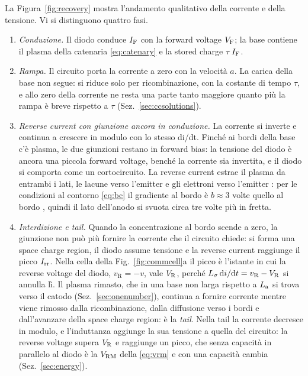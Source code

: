 \documentclass[10pt,a4paper]{scrartcl}
\let\newcommand\pdvaluedefine
\newcommand{\IF}{I_\mathrm{F}}
\newcommand{\VR}{V_\mathrm{R}}
\newcommand{\VF}{V_\mathrm{F}}
\newcommand{\Irr}{I_\mathrm{rr}}
\newcommand{\Vrm}{V_\mathrm{RM}}
\newcommand{\diff}{\mathrm{d}}
\newcommand{\Ls}{L_\sigma}                    %
\newcommand{\La}{L_\mathrm{a}}
\newcommand{\Pp}{p\textsuperscript{+}}
\newcommand{\Nm}{n\textsuperscript{--}}
\newcommand{\Np}{n\textsuperscript{+}}
\begin{document}
La Figura~\ref{fig:recovery} mostra l'andamento qualitativo della corrente e della tensione. Vi si distinguono quattro fasi.
\begin{enumerate}
\item \emph{Conduzione.} Il diodo conduce $\IF$ con la forward voltage $\VF$; la base contiene il plasma della catenaria \eqref{eq:catenary} e la stored charge $\tau\,\IF$.
\item \emph{Rampa.} Il circuito porta la corrente a zero con la velocità $a$. La carica della base non segue: si riduce solo per ricombinazione, con la costante di tempo $\tau$, e allo zero della corrente ne resta una parte tanto maggiore quanto più la rampa è breve rispetto a $\tau$ (Sez.~\ref{sec:ccsolutions}).
\item \emph{Reverse current con giunzione ancora in conduzione.} La corrente si inverte e continua a crescere in modulo con lo stesso di/dt. Finché ai bordi della base c'è plasma, le due giunzioni restano in forward bias: la tensione del diodo è ancora una piccola forward voltage, benché la corrente sia invertita, e il diodo si comporta come un cortocircuito. La reverse current estrae il plasma da entrambi i lati, le lacune verso l'emitter \Pp{} e gli elettroni verso l'emitter \Np: per le condizioni al contorno \eqref{eq:bc} il gradiente al bordo \Pp\Nm{} è $b \approx 3$ volte quello al bordo \Nm\Np, quindi il lato dell'anodo si svuota circa tre volte più in fretta.
\item \emph{Interdizione e tail.} Quando la concentrazione al bordo \Pp\Nm{} scende a zero, la giunzione non può più fornire la corrente che il circuito chiede: si forma una space charge region, il diodo assume tensione e la reverse current raggiunge il picco $\Irr$. Nella cella della Fig.~\ref{fig:commcell}a il picco è l'istante in cui la reverse voltage del diodo, $v_\mathrm{R} = -v$, vale $\VR$, perché $\Ls\,\diff i/\diff t = v_\mathrm{R} - \VR$ si annulla lì. Il plasma rimasto, che in una base non larga rispetto a $\La$ si trova verso il catodo (Sez.~\ref{sec:onenumber}), continua a fornire corrente mentre viene rimosso dalla ricombinazione, dalla diffusione verso i bordi e dall'avanzare della space charge region: è la \emph{tail}. Nella tail la corrente decresce in modulo, e l'induttanza aggiunge la sua tensione a quella del circuito: la reverse voltage supera $\VR$ e raggiunge un picco, che senza capacità in parallelo al diodo è la $\Vrm$ della \eqref{eq:vrm} e con una capacità cambia (Sez.~\ref{sec:energy}).
\end{enumerate}
\end{document}

